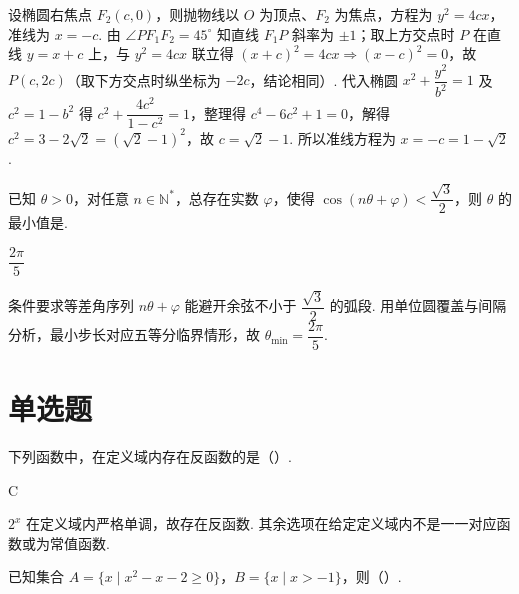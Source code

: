 \begin{solution}
设椭圆右焦点 \(F_2(c,0)\)，则抛物线以 \(O\) 为顶点、\(F_2\) 为焦点，方程为 \(y^2=4cx\)，准线为 \(x=-c\). 由 \(\angle PF_1F_2=45^\circ\) 知直线 \(F_1P\) 斜率为 \(\pm1\)；取上方交点时 \(P\) 在直线 \(y=x+c\) 上，与 \(y^2=4cx\) 联立得 \((x+c)^2=4cx\Rightarrow(x-c)^2=0\)，故 \(P(c,2c)\)（取下方交点时纵坐标为 \(-2c\)，结论相同）. 代入椭圆 \(x^2+\dfrac{y^2}{b^2}=1\) 及 \(c^2=1-b^2\) 得 \(c^2+\dfrac{4c^2}{1-c^2}=1\)，整理得 \(c^4-6c^2+1=0\)，解得 \(c^2=3-2\sqrt2=(\sqrt2-1)^2\)，故 \(c=\sqrt2-1\). 所以准线方程为 \(x=-c=1-\sqrt2\).
\end{solution}

\begin{problem}
已知 \(\theta>0\)，对任意 \(n\in\mathbb N^*\)，总存在实数 \(\varphi\)，使得 \(\cos(n\theta+\varphi)<\dfrac{\sqrt3}{2}\)，则 \(\theta\) 的最小值是\fillinblank{}.
\end{problem}

\begin{answer}
\(\dfrac{2\pi}{5}\)
\end{answer}

\begin{solution}
条件要求等差角序列 \(n\theta+\varphi\) 能避开余弦不小于 \(\dfrac{\sqrt3}{2}\) 的弧段. 用单位圆覆盖与间隔分析，最小步长对应五等分临界情形，故 \(\theta_{\min}=\dfrac{2\pi}{5}\).
\end{solution}
\section{单选题}

\begin{problem}
下列函数中，在定义域内存在反函数的是（\quad）.
\end{problem}

\begin{answer}
C
\end{answer}

\begin{solution}
\(2^x\) 在定义域内严格单调，故存在反函数. 其余选项在给定定义域内不是一一对应函数或为常值函数.
\end{solution}

\begin{problem}
已知集合 \(A=\{x\mid x^2-x-2\ge0\}\)，\(B=\{x\mid x>-1\}\)，则（\quad）.
\end{problem}

